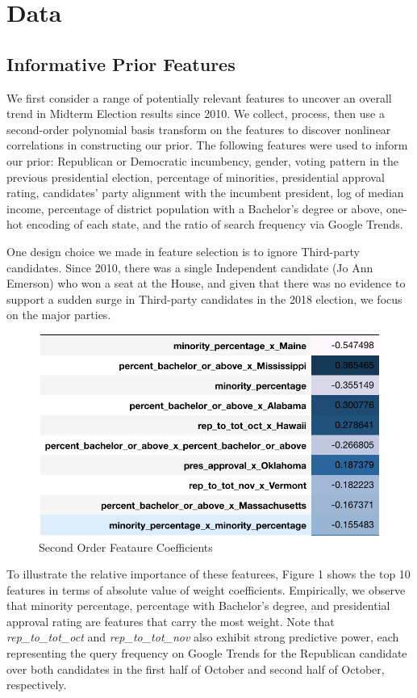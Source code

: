 \documentclass[11pt]{article}
\begin{document}
\section{Data}
\subsection{Informative Prior Features}
We first consider a range of potentially relevant features to uncover an overall trend in Midterm Election results since 2010. We collect, process, then use a second-order polynomial basis transform on the features to discover nonlinear correlations in constructing our prior. The following features were used to inform our prior: Republican or Democratic incumbency, gender, voting pattern in the previous presidential election, percentage of minorities, presidential approval rating, candidates’ party alignment with the incumbent president, log of median income, percentage of district population with a Bachelor’s degree or above, one-hot encoding of each state, and the ratio of search frequency via Google Trends.

 One design choice we made in feature selection is to ignore Third-party candidates. Since 2010, there was a single Independent candidate (Jo Ann Emerson) who won a seat at the House, and given that there was no evidence to support a sudden surge in Third-party candidates in the 2018 election, we focus on the major parties.

 \begin{figure}[tbh]
  \centering
  \includegraphics[scale=0.8]{feature_coeff}
  \caption{Second Order Feataure Coefficients}
  \label{fig:Feataure Coefficients}
\end{figure}

To illustrate the relative importance of these featurees, Figure 1 shows the top 10 features in terms of absolute value of weight coefficients. Empirically, we observe that minority percentage, percentage with Bachelor's degree, and presidential approval rating are features that carry the most weight. Note that \textit{rep\_to\_tot\_oct} and \textit{rep\_to\_tot\_nov} also exhibit strong predictive power, each representing the query frequency on Google Trends for the Republican candidate over both candidates in the first half of October and second half of October, respectively.
\end{document}
